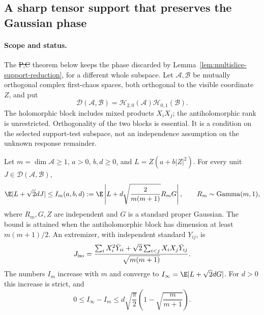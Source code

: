 \subsection{A sharp tensor support that preserves the Gaussian phase}
\label{sec:phase-preserving-contact}

\paragraph{Scope and status.}
The \st{P,C} theorem below keeps the phase discarded by
Lemma~\ref{lem:multislice-support-reduction}, for a different whole
subspace. Let $\mathcal A,\mathcal B$ be mutually orthogonal complex
first-chaos spaces, both orthogonal to the visible coordinate $Z$, and
put
\[
 \mathcal D(\mathcal A,\mathcal B)
   =\mathcal H_{2,0}(\mathcal A)\mathcal H_{0,1}(\mathcal B).
\]
The holomorphic block includes mixed products $X_iX_j$; the
antiholomorphic rank is unrestricted. Orthogonality of the two blocks
is essential. It is a condition on the selected support-test subspace,
not an independence assumption on the unknown response remainder.

\begin{theorem}
\label{thm:sharp-decoupled-support}
Let $m=\dim\mathcal A\ge1$, $a>0$, $b,d\ge0$, and
$L=Z(a+b|Z|^2)$. For every unit $J\in\mathcal D(\mathcal A,\mathcal B)$,
\begin{equation}\label{eq:sharp-decoupled-support}
 \E|L+\sqrt2dJ|
 \le I_m(a,b,d):=
 \E\left|L+d\sqrt{\frac{2}{m(m+1)}}R_mG\right|,
 \qquad R_m\sim\operatorname{Gamma}(m,1),
\end{equation}
where $R_m,G,Z$ are independent and $G$ is a standard proper Gaussian.
The bound is attained when the antiholomorphic block has dimension at
least $m(m+1)/2$. An extremizer, with independent standard $Y_{ij}$, is
\[
 J_{\rm iso}=
 \frac{\sum_iX_i^2\bar Y_{ii}
       +\sqrt2\sum_{i<j}X_iX_j\bar Y_{ij}}{\sqrt{m(m+1)}}.
\]
The numbers $I_m$ increase with $m$ and converge to
$I_\infty=\E|L+\sqrt2dG|$. For $d>0$ this increase is strict, and
\[
 0\le I_\infty-I_m\le
 d\sqrt{\frac\pi2}\left(1-\sqrt{\frac m{m+1}}\right).
\]
\end{theorem}

